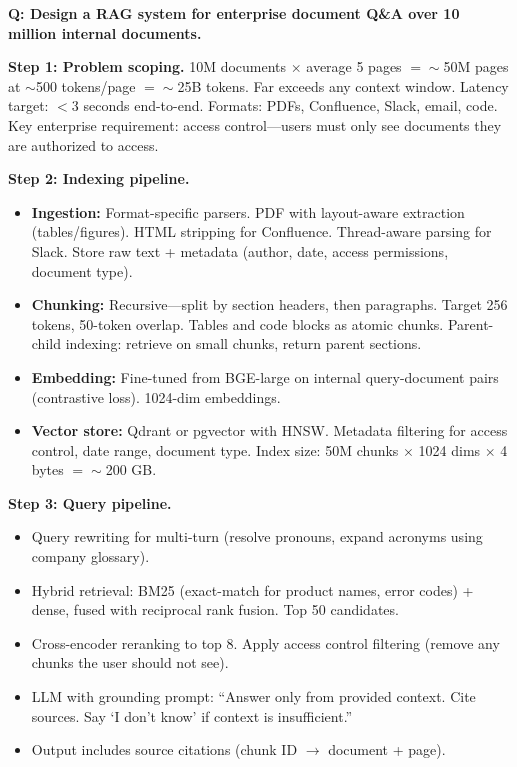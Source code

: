 \begin{interviewq}
\end{interviewq}


\begin{interviewq}
\textbf{Q: Design a RAG system for enterprise document Q\&A over 10 million internal documents.}

 \quad {} \quad \badgefreq{\freqhigh}

\stronganswer

\textbf{Step 1: Problem scoping.} 10M documents $\times$ average 5 pages $= \sim$50M pages at $\sim$500 tokens/page $= \sim$25B tokens. Far exceeds any context window. Latency target: $<$3 seconds end-to-end. Formats: PDFs, Confluence, Slack, email, code. Key enterprise requirement: access control---users must only see documents they are authorized to access.

\textbf{Step 2: Indexing pipeline.}
\begin{itemize}
    \item \textbf{Ingestion:} Format-specific parsers. PDF with layout-aware extraction (tables/figures). HTML stripping for Confluence. Thread-aware parsing for Slack. Store raw text + metadata (author, date, access permissions, document type).
    \item \textbf{Chunking:} Recursive---split by section headers, then paragraphs. Target 256 tokens, 50-token overlap. Tables and code blocks as atomic chunks. Parent-child indexing: retrieve on small chunks, return parent sections.
    \item \textbf{Embedding:} Fine-tuned from BGE-large on internal query-document pairs (contrastive loss). 1024-dim embeddings.
    \item \textbf{Vector store:} Qdrant or pgvector with HNSW. Metadata filtering for access control, date range, document type. Index size: 50M chunks $\times$ 1024 dims $\times$ 4 bytes $= \sim$200 GB.
\end{itemize}

\textbf{Step 3: Query pipeline.}
\begin{itemize}
    \item Query rewriting for multi-turn (resolve pronouns, expand acronyms using company glossary).
    \item Hybrid retrieval: BM25 (exact-match for product names, error codes) + dense, fused with reciprocal rank fusion. Top 50 candidates.
    \item Cross-encoder reranking to top 8. Apply access control filtering (remove any chunks the user should not see).
    \item LLM with grounding prompt: ``Answer only from provided context. Cite sources. Say `I don't know' if context is insufficient.''
    \item Output includes source citations (chunk ID $\rightarrow$ document + page).
\end{itemize}


\end{interviewq}
